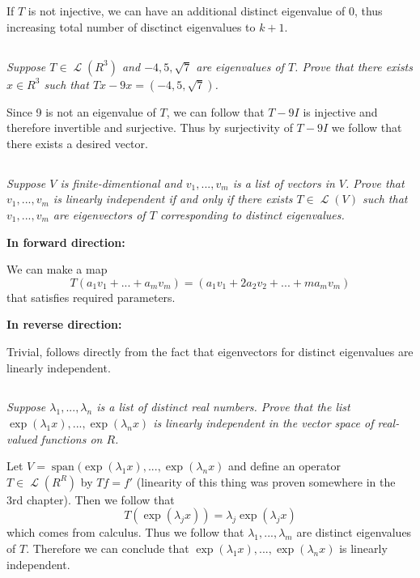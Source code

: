 \documentclass[11pt,oneside,titlepage]{book}
\DeclareMathOperator \map {\mathcal {L}}
\DeclareMathOperator \Span {span}
\begin{document}
If $T$ is not injective, we can have an additional distinct eigenvalue of $0$, thus increasing
total number of disctinct eigenvalues to $k + 1$.

\subsection{}

\textit{Suppose $T \in \map(R^3)$ and $-4, 5, \sqrt{7}$ are eigenvalues of $T$. Prove that
  there exists $x \in R^3$ such that $Tx - 9x = (-4, 5, \sqrt{7})$.}

Since 9 is not an eigenvalue of $T$, we can follow that $T - 9I$ is injective and therefore
invertible and surjective. Thus by surjectivity of $T - 9I$ we follow that
there exists a desired vector.


\subsection{}

\textit{Suppose $V$ is finite-dimentional and $v_1, ..., v_m$ is a list of vectors in $V$. Prove
  that $v_1, ..., v_m$ is linearly independent if and only if there exists $T \in \map(V)$ such
  that $v_1, ..., v_m$ are eigenvectors of $T$ corresponding to distinct eigenvalues.}

\textbf{In forward direction: }

We can make a map
$$T(a_1 v_1 + ... + a_m v_m) = (a_1 v_1 +  2 a_2 v_2 + ... + m a_m v_m)$$
that satisfies required parameters.

\textbf{In reverse direction: }

Trivial, follows directly from the fact that eigenvectors for distinct eigenvalues are linearly
independent.

\subsection{}

\textit{Suppose $\lambda_1, ..., \lambda_n$ is a list of distinct real numbers. Prove that
  the list $\exp(\lambda_1 x), ..., \exp(\lambda_n x)$ is linearly independent in the vector
  space of real-valued functions on $R$.}

Let $V = \Span(\exp(\lambda_1 x), ..., \exp(\lambda_n x)$ and define an operator $T \in \map(R^R)$
by $Tf =  f'$ (linearity of this thing was proven somewhere in the 3rd chapter). Then we
follow that
$$T(\exp(\lambda_j x)) = \lambda_j \exp(\lambda_j x)$$
which comes from calculus. Thus we follow that $\lambda_1, ..., \lambda_m$ are distinct
eigenvalues of $T$. Therefore we can conclude that $\exp(\lambda_1 x), ..., \exp(\lambda_n x)$
is linearly independent.
\end{document}
